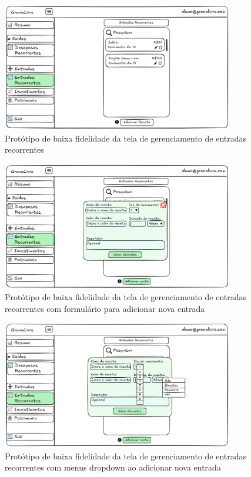 \begin{figure}[H]
    \centering
    \includegraphics[width=0.9\textwidth]{imgs/07-entradas-recorrentes.png}
    \caption{Protótipo de baixa fidelidade da tela de gerenciamento de entradas recorrentes}
    \label{fig:prot_entradas_recorrentes}
\end{figure}

\begin{figure}[H]
    \centering
    \includegraphics[width=0.9\textwidth]{imgs/07-entradas-recorrentes2.png}
    \caption{Protótipo de baixa fidelidade da tela de gerenciamento de entradas recorrentes com formulário para adicionar nova entrada}
    \label{fig:prot_entradas_recorrentes2}
\end{figure}

\begin{figure}[H]
    \centering
    \includegraphics[width=0.9\textwidth]{imgs/07-entradas-recorrentes3.png}
    \caption{Protótipo de baixa fidelidade da tela de gerenciamento de entradas recorrentes com menus dropdown ao adicionar nova entrada}
    \label{fig:prot_entradas_recorrentes3}
\end{figure}

